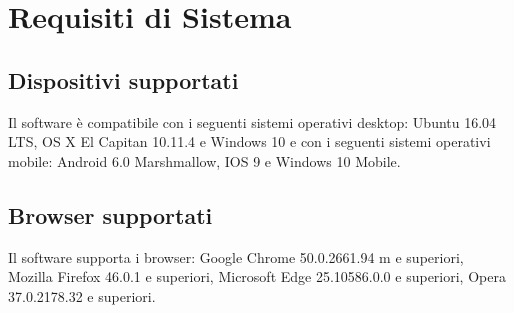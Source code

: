 \newpage
\section{Requisiti di Sistema}
\subsection{Dispositivi supportati}
Il software \progetto{} è compatibile con i seguenti sistemi operativi desktop: Ubuntu 16.04 LTS, OS X El Capitan 10.11.4 e Windows 10 e con i seguenti sistemi operativi mobile: Android 6.0 Marshmallow, IOS 9 e Windows 10 Mobile.
\subsection{Browser supportati}
Il software \progetto{} supporta i browser: Google Chrome 50.0.2661.94 m e superiori, Mozilla Firefox 46.0.1 e superiori, Microsoft Edge 25.10586.0.0 e superiori, Opera 37.0.2178.32 e superiori.